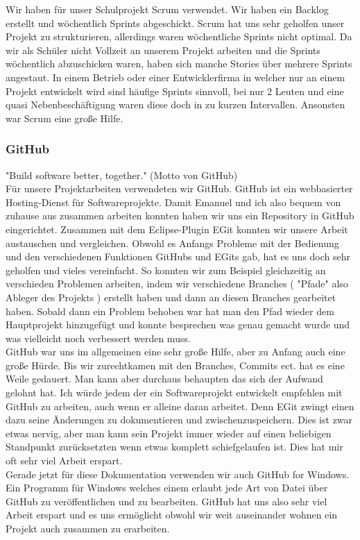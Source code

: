 Wir haben für unser Schulprojekt Scrum verwendet. Wir haben ein Backlog erstellt und wöchentlich Sprints abgeschickt. Scrum hat uns sehr geholfen unser Projekt zu strukturieren, allerdings waren wöchentliche Sprints nicht optimal. Da wir als Schüler nicht Vollzeit an unserem Projekt arbeiten und die Sprints wöchentlich abzuschicken waren, haben sich manche Stories über mehrere Sprints angestaut. In einem Betrieb oder einer Entwicklerfirma in welcher nur an einem Projekt entwickelt wird sind häufige Sprints sinnvoll, bei nur 2 Leuten und eine quasi Nebenbeschäftigung waren diese doch in zu kurzen Intervallen. Ansonsten war Scrum eine große Hilfe.




\subsubsection{GitHub} \label{sssec:GitHub}
"Build software better, together." (Motto von GitHub)\\

Für unsere Projektarbeiten verwendeten wir GitHub. GitHub ist ein webbasierter Hosting-Dienst für 
Softwareprojekte. Damit Emanuel und ich also bequem von zuhause aus zusammen arbeiten konnten haben 
wir uns ein Repository in GitHub eingerichtet. Zusammen mit dem Eclipse-Plugin EGit konnten wir 
unsere Arbeit austauschen und vergleichen. Obwohl es Anfangs Probleme mit der Bedienung und den 
verschiedenen Funktionen GitHubs und EGits gab, hat es uns doch sehr geholfen und vieles 
vereinfacht. So konnten wir zum Beispiel gleichzeitig an verschieden Problemen arbeiten, indem wir 
verschiedene Branches ( "Pfade" also Ableger des Projekts ) erstellt haben und dann an diesen 
Branches gearbeitet haben. Sobald dann ein Problem behoben war hat man den Pfad wieder dem 
Hauptprojekt hinzugefügt und konnte besprechen was genau gemacht wurde und was vielleicht noch 
verbessert werden muss.\\

GitHub war uns im allgemeinen eine sehr große Hilfe, aber zu Anfang auch eine große Hürde. Bis wir 
zurechtkamen mit den Branches, Commits ect. hat es eine Weile gedauert. Man kann aber durchaus 
behaupten das sich der Aufwand gelohnt hat. Ich würde jedem der ein Softwareprojekt entwickelt 
empfehlen mit GitHub zu arbeiten, auch wenn er alleine daran arbeitet. Denn EGit zwingt einen dazu 
seine Änderungen zu dokumentieren und zwischenzuspeichern. Dies ist zwar etwas nervig, aber man 
kann 
sein Projekt immer wieder auf einen beliebigen Standpunkt zurücksetzten wenn etwas komplett 
schiefgelaufen ist. Dies hat mir oft sehr viel Arbeit erspart.\\

Gerade jetzt für diese Dokumentation verwenden wir auch GitHub for Windows. Ein Programm für 
Windows 
welches einem erlaubt jede Art von Datei über GitHub zu veröffentlichen und zu bearbeiten. GitHub 
hat uns also sehr viel Arbeit erspart und es uns ermöglicht obwohl wir weit auseinander wohnen ein 
Projekt auch zusammen zu erarbeiten.\\


